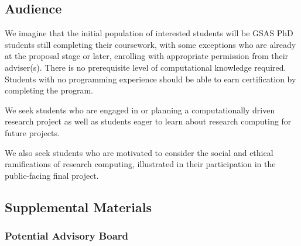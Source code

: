 \documentclass[%
  ,
  article,
  ,
  oneside
  ]{memoir}
\begin{document}
\hypertarget{audience}{%
\subsection{Audience}\label{audience}}

We imagine that the initial population of interested students will be
GSAS PhD students still completing their coursework, with some
exceptions who are already at the proposal stage or later, enrolling
with appropriate permission from their adviser(s). There is no
prerequisite level of computational knowledge required. Students with no
programming experience should be able to earn certification by
completing the program.

We seek students who are engaged in or planning a computationally driven
research project as well as students eager to learn about research
computing for future projects.

We also seek students who are motivated to consider the social and
ethical ramifications of research computing, illustrated in their
participation in the public-facing final project.

\hypertarget{supplemental-materials}{%
\subsection{Supplemental Materials}\label{supplemental-materials}}

\hypertarget{potential-advisory-board}{%
\subsubsection{Potential Advisory
Board}\label{potential-advisory-board}}
\end{document}
